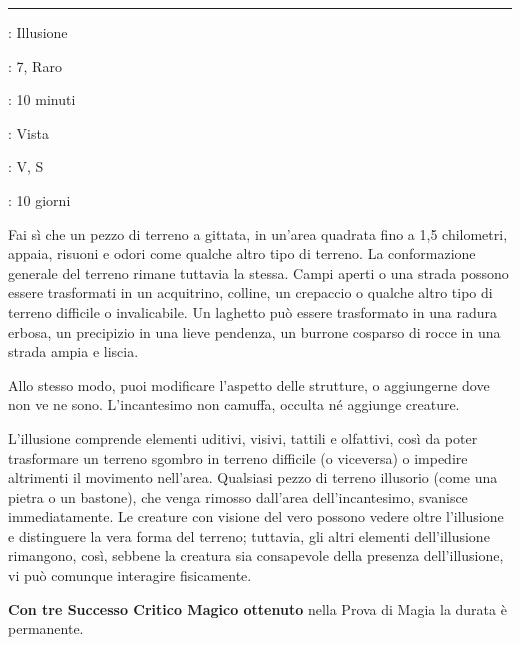 \begin{multicols}{2}
\begin{itemize}[leftmargin=*]
\end{itemize}

\smallskip\noindent\rule{\linewidth}{2pt} \hypertarget{Miraggio Arcano}{}\smallskip{}
\noindent
\begin{description}[noitemsep, topsep=0pt, parsep=0pt, partopsep=0pt, leftmargin=0cm, labelwidth=2.8cm]
	\item[\textbf{Lista di Magia}]: Illusione
	\item[\textbf{Livello}]: 7, Raro
	\item[\textbf{T. di Lancio}]: 10 minuti
	\item[\textbf{Gittata}]: Vista
	\item[\textbf{Componenti}]: V, S
	\item[\textbf{Durata}]: 10 giorni
\end{description}

Fai sì che un pezzo di terreno a gittata, in un'area quadrata fino a 1,5 chilometri, appaia, risuoni e odori come qualche altro tipo di terreno. La conformazione generale del terreno rimane tuttavia la stessa. Campi aperti o una strada possono essere trasformati in un acquitrino, colline, un crepaccio o qualche altro tipo di terreno difficile o invalicabile. Un laghetto può essere trasformato in una radura erbosa, un precipizio in una lieve pendenza, un burrone cosparso di rocce in una strada ampia e liscia.

Allo stesso modo, puoi modificare l'aspetto delle strutture, o aggiungerne dove non ve ne sono. L'incantesimo non camuffa, occulta né aggiunge creature.

L'illusione comprende elementi uditivi, visivi, tattili e olfattivi, così da poter trasformare un terreno sgombro in terreno difficile (o viceversa) o impedire altrimenti il movimento nell'area. Qualsiasi pezzo di terreno illusorio (come una pietra o un bastone), che venga rimosso dall'area dell'incantesimo, svanisce immediatamente. Le creature con visione del vero possono vedere oltre l'illusione e distinguere la vera forma del terreno; tuttavia, gli altri elementi dell'illusione rimangono, così, sebbene la creatura sia consapevole della presenza dell'illusione, vi può comunque interagire fisicamente.

\textbf{Con tre Successo Critico Magico ottenuto} nella Prova di Magia la durata è permanente.


\end{multicols}
